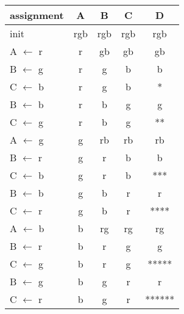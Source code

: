 \begin{tabular}{l || c | c | c | c }
	assignment & A & B & C & D \\ \hline
	init & rgb & rgb & rgb & rgb  \\
	A $\leftarrow$ r & r & gb & gb & gb \\
	B $\leftarrow$ g & r & g & b & b \\
	C $\leftarrow$ b & r & g & b & * \\
	B $\leftarrow$ b & r & b & g & g \\
	C $\leftarrow$ g & r & b & g & ** \\
	A $\leftarrow$ g & g & rb & rb & rb \\
	B $\leftarrow$ r & g & r & b & b  \\
	C $\leftarrow$ b & g & r & b & *** \\
	B $\leftarrow$ b & g & b & r & r \\
	C $\leftarrow$ r & g & b & r & **** \\
	A $\leftarrow$ b & b & rg & rg & rg \\
	B $\leftarrow$ r & b & r & g & g \\
	C $\leftarrow$ g & b & r & g & ***** \\
	B $\leftarrow$ g & b & g & r & r \\
	C $\leftarrow$ r & b & g & r & ****** \\
\end{tabular}
